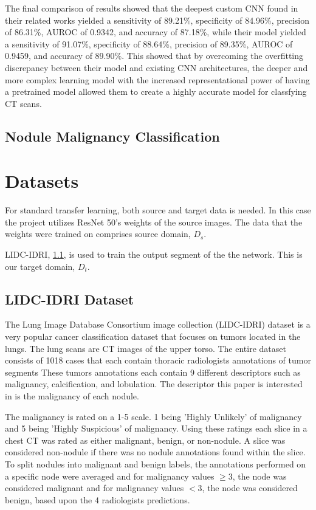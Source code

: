 \documentclass[10pt,twocolumn,letterpaper]{article}
\begin{document}
      The final comparison of results showed that the deepest custom CNN found in their related works yielded a sensitivity of
      89.21\%, specificity of 84.96\%, precision of 86.31\%, AUROC of 0.9342, and accuracy of 87.18\%, while their model
      yielded a sensitivity of 91.07\%, specificity of 88.64\%, precision of 89.35\%, AUROC of 0.9459, and accuracy of 89.90\%.
      This showed that by overcoming the overfitting discrepancy between their model and existing CNN architectures, the
      deeper and more complex learning model with the increased representational power of having a pretrained model
      allowed them to create a highly accurate model for classfying CT scans.

   \subsection{Nodule Malignancy Classification} \label{sec:related-nodulex}


\section{Datasets} \label{sec:data}
   For standard transfer learning, both source and target data is needed. In this case
   the project utilizes ResNet 50's weights of the source images. The data that the weights
   were trained on comprises source domain, $D_s$.

   LIDC-IDRI, \ref{sec:data-lidc}, is used to train the output segment of the
   the network. This is our target domain, $D_t$.

   \subsection{LIDC-IDRI Dataset} \label{sec:data-lidc}
      The Lung Image Database Consortium image collection (LIDC-IDRI) dataset
      is a very popular cancer classification dataset that focuses on tumors located
      in the lungs. The lung scans are CT images of the upper torso. The entire dataset
      consists of 1018 cases that each contain thoracic radiologists annotations of tumor segments
      These tumors annotations each contain 9 different descriptors such as malignancy,
      calcification, and lobulation. The descriptor this paper is interested in is the
      malignancy of each nodule.

      The malignancy is rated on a 1-5 scale. 1 being 'Highly Unlikely' of malignancy and
      5 being 'Highly Suspicious' of malignancy. Using these ratings each slice in a chest CT
      was rated as either malignant, benign, or non-nodule. A slice was considered non-nodule
      if there was no nodule annotations found within the slice. To split nodules into malignant
      and benign labels, the annotations performed on a specific node were averaged and for malignancy
      values $\ge 3$, the node was considered malignant and for malignancy values $< 3$, the node was
      considered benign, based upon the 4 radiologists predictions.
    
\end{document}
